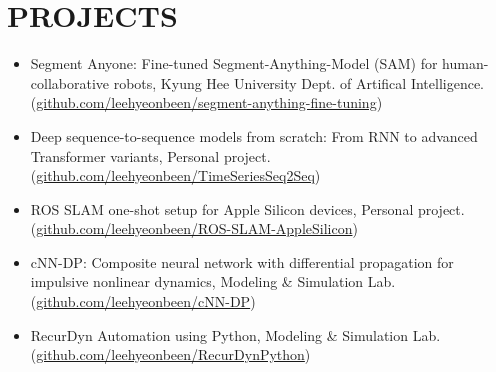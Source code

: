 \documentclass[a4paper,10pt]{extarticle}
\begin{document}
\section*{PROJECTS}
\begin{itemize}
	\item Segment Anyone: Fine-tuned Segment-Anything-Model (SAM) for human-collaborative robots, Kyung Hee University Dept. of Artifical Intelligence. (\href{https://github.com/leehyeonbeen/segment-anything-fine-tuning}{github.com/leehyeonbeen/segment-anything-fine-tuning})

	\item Deep sequence-to-sequence models from scratch: From RNN to advanced Transformer variants, Personal project. (\href{https://github.com/leehyeonbeen/TimeSeriesSeq2Seq}{github.com/leehyeonbeen/TimeSeriesSeq2Seq})

	\item ROS SLAM one-shot setup for Apple Silicon devices, Personal project. (\href{https://github.com/leehyeonbeen/ROS-SLAM-AppleSilicon}{github.com/leehyeonbeen/ROS-SLAM-AppleSilicon})

	\item cNN-DP: Composite neural network with differential propagation for impulsive nonlinear dynamics, Modeling \& Simulation Lab. (\href{https://github.com/leehyeonbeen/cNN-DP}{github.com/leehyeonbeen/cNN-DP})

	\item RecurDyn Automation using Python, Modeling \& Simulation Lab. (\href{https://github.com/leehyeonbeen/RecurDynPython}{github.com/leehyeonbeen/RecurDynPython})
\end{itemize}

\end{document}
